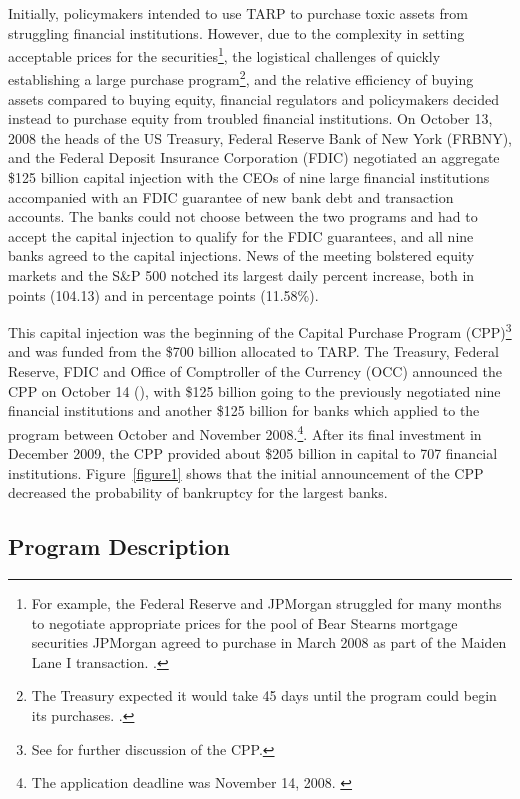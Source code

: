 \documentclass[12pt]{article}
\begin{document}
Initially, policymakers intended to use TARP to purchase toxic assets from struggling financial institutions. However, due to the complexity in setting acceptable prices for the securities\footnote{For example, the Federal Reserve and JPMorgan struggled for many months to negotiate appropriate prices for the pool of Bear Stearns mortgage securities JPMorgan agreed to purchase in March 2008 as part of the Maiden Lane I transaction. \citep{Geithner}.}, the logistical challenges of quickly establishing a large purchase program\footnote{The Treasury expected it would take 45 days until the program could begin its purchases. \citep{Geithner}.}, and the relative efficiency of buying assets compared to buying equity, financial regulators and policymakers decided instead to purchase equity from troubled financial institutions. On October 13, 2008 the heads of the US Treasury, Federal Reserve Bank of New York (FRBNY), and the Federal Deposit Insurance Corporation (FDIC) negotiated an aggregate \$125 billion capital injection with the CEOs of nine large financial institutions accompanied with an FDIC guarantee of new bank debt and transaction accounts. The banks could not choose between the two programs and had to accept the capital injection to qualify for the FDIC guarantees, and all nine banks agreed to the capital injections. News of the meeting bolstered equity markets and the S\&P 500 notched its largest daily percent increase, both in points (104.13) and in percentage points (11.58\%).

This capital injection was the beginning of the Capital Purchase Program (CPP)\footnote{See \citet{Ross2016b} for further discussion of the CPP.} and was funded from the \$700 billion allocated to TARP. The Treasury, Federal Reserve, FDIC and Office of Comptroller of the Currency (OCC) announced the CPP on October 14 (\citet{Paulson}), with \$125 billion going to the previously negotiated nine financial institutions and another \$125 billion for banks which applied to the program between October and November 2008.\footnote{The application deadline was November 14, 2008. \citep{CPPInstructions}}.  After its final investment in December 2009, the CPP provided about \$205 billion in capital to 707 financial institutions. Figure~\ref{figure1} shows that the initial announcement of the CPP decreased the probability of bankruptcy for the largest banks.

\subsection{Program Description}
\end{document}
